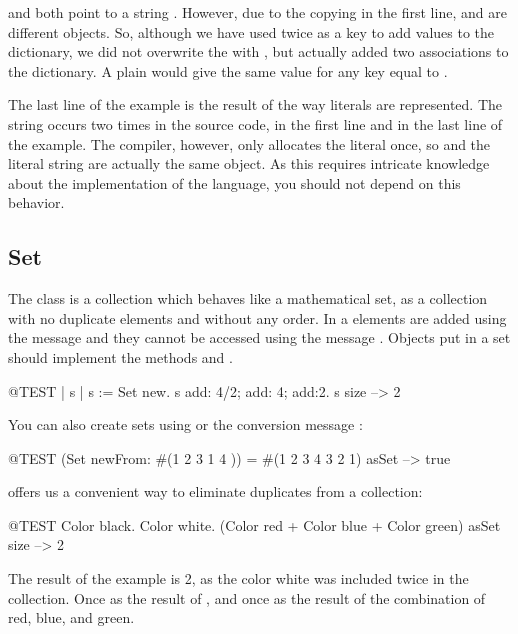 \documentclass[a4paper,10pt,twoside]{book}
\begin{document}
\noindent
{} and  both point to a string . However, due to the copying in the first line,  and  are different objects. So, although we have used  twice as a key to add values to the dictionary, we did not overwrite the  with , but actually added two associations to the dictionary.
A plain  would give the same value for any key equal to .

The last line of the example is the result of the way literals are represented. The string  occurs two times in the source code, in the first line and in the last line of the example. The compiler, however, only allocates the literal once, so  and the literal string  are actually the same object. As this requires intricate knowledge about the implementation of the language, you should not depend on this behavior.


\subsection{Set}
The class  is a collection which behaves like a mathematical set, \ie as a collection with no duplicate elements and without any order.
In a  elements are added using the message  and they cannot be accessed using the message .
Objects put in a set should implement the methods  and \ct{=}.

\begin{code}{@TEST | s | }
s := Set new.
s add: 4/2; add: 4; add:2.
s size --> 2
\end{code}

You can also create sets using  or the conversion message :

\begin{code}{@TEST}
(Set newFrom: #(1 2 3 1 4 )) = #(1 2 3 4 3 2 1) asSet --> true
\end{code}

 offers us a convenient way to eliminate duplicates from a collection:

\begin{code}{@TEST}
{Color black. Color white. (Color red + Color blue + Color green)} asSet size --> 2
\end{code}

\noindent
The result of the example is 2, as the color white was included twice in the collection. Once as the result of , and once as the result of the combination of red, blue, and green.
\end{document}
